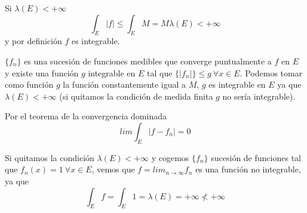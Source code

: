 
Si $\lambda (E) < +\infty$
\[ \int_E |f| \leq \int_E M = M\lambda (E) < +\infty\]
y por definición $f$ es integrable.

$\{f_n\}$ es una sucesión de funciones medibles que converge puntualmente a $f$ en $E$ y existe una función $g$ integrable en $E$ tal que $\{ |f_n| \}\leq g \ \forall x\in E$. 
Podemos tomar como función $g$ la función constantemente igual a $M$, $g$ es integrable en $E$ ya que $\lambda (E)<+\infty$ (si quitamos la condición de medida finita $g$ no sería integrable).

Por el teorema de la convergencia dominada
\[ lim \int_E |f-f_n| = 0
\]

Si quitamos la condición $\lambda (E)<+\infty$ y cogemos $\{f_n\}$ sucesión de funciones tal que $f_n(x) = 1 \ \forall x \in E$, vemos que $f=lim_{n\rightarrow \infty} f_n$ es una función no integrable, ya que
\[\int_Ef = \int_E1 = \lambda (E) = +\infty \not < +\infty \]
